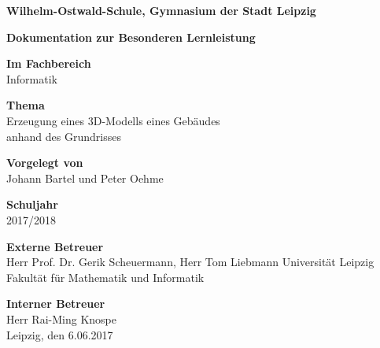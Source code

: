 \begin{center}
	\thispagestyle{empty}
			\textbf{Wilhelm-Ostwald-Schule, Gymnasium der Stadt Leipzig}
			
			\Large
			\textbf{Dokumentation zur Besonderen Lernleistung} \break
			
			\large
			\textbf{Im Fachbereich}\\
			Informatik \break
			
			
			\textbf{Thema}\\
			Erzeugung eines 3D-Modells eines Gebäudes\\ anhand des Grundrisses \break
			
			\textbf{Vorgelegt von}\\
			Johann Bartel und Peter Oehme \break
			
			\textbf{Schuljahr}\\
			2017/2018 \break
			
			\textbf{Externe Betreuer}\\
			Herr Prof. Dr. Gerik Scheuermann, Herr Tom Liebmann \break
			Universität Leipzig
			Fakultät für Mathematik und Informatik \break
			
			\textbf{Interner Betreuer}\\
			Herr Rai-Ming Knospe\\
			Leipzig, den 6.06.2017
			
	 
			
\end{center}